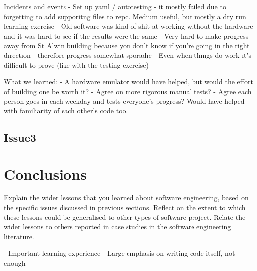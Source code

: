\documentclass{l3proj}
\begin{document}
Incidents and events
- Set up yaml / autotesting - it mostly failed due to forgetting to add supporitng files to repo. Medium useful, but mostly a dry run learning exercise
- Old software was kind of shit at working without the hardware and it was hard to see if the results were the same
- Very hard to make progress away from St Alwin building because you don't know if you're going in the right direction - therefore progress somewhat sporadic
- Even when things do work it's difficult to prove (like with the testing exercise)

What we learned:
- A hardware emulator would have helped, but would the effort of building one be worth it?
- Agree on more rigorous manual tests?
- Agree each person goes in each weekday and tests everyone's progress? Would have helped with familiarity of each other's code too.

\subsection{Issue3}


\section{Conclusions}
Explain the wider lessons that you learned about software engineering,
based on the specific issues discussed in previous sections.  Reflect
on the extent to which these lessons could be generalised to other
types of software project.  Relate the wider lessons to others
reported in case studies in the software engineering literature.

- Important learning experience
- Large emphasis on writing code itself, not enough 



\end{document}
